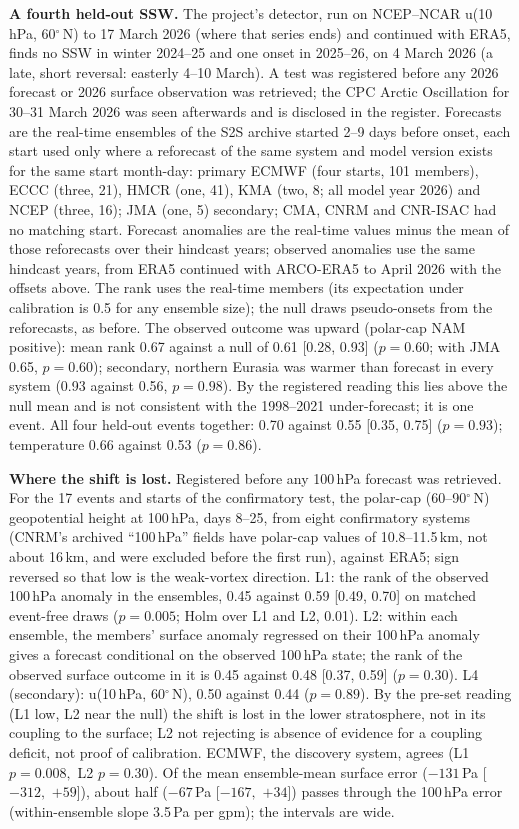 \documentclass[11pt]{article}
\begin{document}
\textbf{A fourth held-out SSW.} The project's detector, run on NCEP–NCAR u(10\,hPa, 60$^\circ$\,N) to 17 March 2026 (where that series ends) and continued with ERA5, finds no SSW in winter 2024–25 and one onset in 2025–26, on 4 March 2026 (a late, short reversal: easterly 4–10 March). A test was registered before any 2026 forecast or 2026 surface observation was retrieved; the CPC Arctic Oscillation for 30–31 March 2026 was seen afterwards and is disclosed in the register. Forecasts are the real-time ensembles of the S2S archive started 2–9 days before onset, each start used only where a reforecast of the same system and model version exists for the same start month-day: primary ECMWF (four starts, 101 members), ECCC (three, 21), HMCR (one, 41), KMA (two, 8; all model year 2026) and NCEP (three, 16); JMA (one, 5) secondary; CMA, CNRM and CNR-ISAC had no matching start. Forecast anomalies are the real-time values minus the mean of those reforecasts over their hindcast years; observed anomalies use the same hindcast years, from ERA5 continued with ARCO-ERA5 to April 2026 with the offsets above. The rank uses the real-time members (its expectation under calibration is 0.5 for any ensemble size); the null draws pseudo-onsets from the reforecasts, as before. The observed outcome was upward (polar-cap NAM positive): mean rank 0.67 against a null of 0.61 [0.28, 0.93] ($p = 0.60$; with JMA 0.65, $p = 0.60$); secondary, northern Eurasia was warmer than forecast in every system (0.93 against 0.56, $p = 0.98$). By the registered reading this lies above the null mean and is not consistent with the 1998–2021 under-forecast; it is one event. All four held-out events together: 0.70 against 0.55 [0.35, 0.75] ($p = 0.93$); temperature 0.66 against 0.53 ($p = 0.86$).

\textbf{Where the shift is lost.} Registered before any 100\,hPa forecast was retrieved. For the 17 events and starts of the confirmatory test, the polar-cap (60–90$^\circ$\,N) geopotential height at 100\,hPa, days 8–25, from eight confirmatory systems (CNRM's archived “100\,hPa” fields have polar-cap values of 10.8–11.5\,km, not about 16\,km, and were excluded before the first run), against ERA5; sign reversed so that low is the weak-vortex direction. L1: the rank of the observed 100\,hPa anomaly in the ensembles, 0.45 against 0.59 [0.49, 0.70] on matched event-free draws ($p = 0.005$; Holm over L1 and L2, 0.01). L2: within each ensemble, the members' surface anomaly regressed on their 100\,hPa anomaly gives a forecast conditional on the observed 100\,hPa state; the rank of the observed surface outcome in it is 0.45 against 0.48 [0.37, 0.59] ($p = 0.30$). L4 (secondary): u(10\,hPa, 60$^\circ$\,N), 0.50 against 0.44 ($p = 0.89$). By the pre-set reading (L1 low, L2 near the null) the shift is lost in the lower stratosphere, not in its coupling to the surface; L2 not rejecting is absence of evidence for a coupling deficit, not proof of calibration. ECMWF, the discovery system, agrees (L1 $p = 0.008,$ L2 $p = 0.30$). Of the mean ensemble-mean surface error ($-131$\,Pa [$-312{,}$ $+59$]), about half ($-67$\,Pa [$-167{,}$ $+34$]) passes through the 100\,hPa error (within-ensemble slope 3.5\,Pa per gpm); the intervals are wide.
\end{document}
